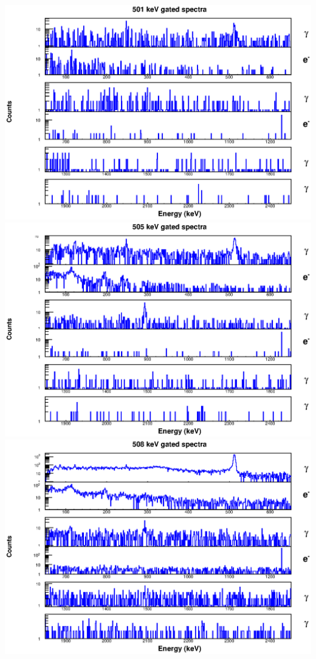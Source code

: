 \includegraphics[scale=0.8]{154Gd_Appendix/501_combined.eps}
\includegraphics[scale=0.8]{154Gd_Appendix/505_combined.eps}
\includegraphics[scale=0.8]{154Gd_Appendix/508_combined.eps}
